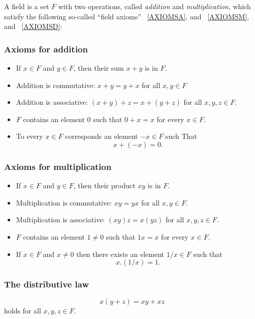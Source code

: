 \begin{definition}
    A field is a set $F$ with two operations, called \textit{addition} and \textit{multiplication},
    which satisfy the following so-called ``field axioms'' ~\ref{AXIOMSA}, and ~\ref{AXIOMSM}, and ~\ref{AXIOMSD}:


\subsubsection*{\textbf{Axioms for addition}}
\label{AXIOMSA}
\begin{itemize}
    \item If $x \in F$ and $y \in F$, then their sum $x+y$ is in $F$.
    \item Addition is commutative: $x+y=y+x$ for all $x,y \in F$
    \item Addition is associative: $(x+y)+z=x+(y+z)$ for all $x,y,z \in F$.
    \item $F$ contains an element $0$ such that $0+x=x$ for every $x \in F$.
    \item To every $x \in F$ corresponds an element $-x \in F$ such That
        \begin{equation*}
            x+(-x)=0.
        \end{equation*} 
\end{itemize}
\subsubsection*{\textbf{Axioms for multiplication}}
\label{AXIOMSM}
\begin{itemize}
    \item If $x \in F$ and $y \in F$, then their product $xy$ is in $F$.
    \item Multiplication is commutative: $xy=yx$ for all $x,y \in F$.
    \item Multiplication is associative: $(xy)z=x(yz)$ for all $x,y,z \in F$.
    \item $F$ contains an element $1 \neq 0$ such that $1x=x$ for every $x \in F$.
    \item If $x \in F$ and $x \neq 0$ then there exists an element $1/x \in F$ such that
    \begin{equation*}
        x.(1/x)=1.
    \end{equation*}
\end{itemize}

\subsubsection*{\textbf{The distributive law}}
\label{AXIOMSD}

\begin{equation*}
    x(y+z)=xy+xz
\end{equation*}
holds for all $x,y,z \in F$.
\end{definition}


